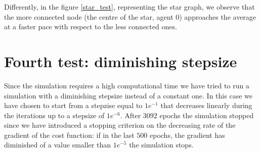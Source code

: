 \documentclass[a4paper,11pt,oneside]{book}
\begin{document}
Differently, in the figure \ref{star_test}, representing the star graph, we observe that the more connected node (the centre of the star, agent 0) approaches the average at a faster pace with respect to the less connected ones.

\section{Fourth test: diminishing stepsize}
Since the simulation requires a high computational time we have tried to run a simulation with a diminishing stepsize instead of a constant one. In this case we have chosen to start from a stepzise equal to $1e^{-1}$ that decreases linearly during the iterations up to a stepsize of $1e^{-6}$.
After $3092$ epochs the simulation stopped since we have introduced a stopping criterion on the decreasing rate of the gradient of the cost function: if in the last $500$ epochs, the gradient has diminished of a value smaller than $1e^{-5}$ the simulation stops.
\end{document}
